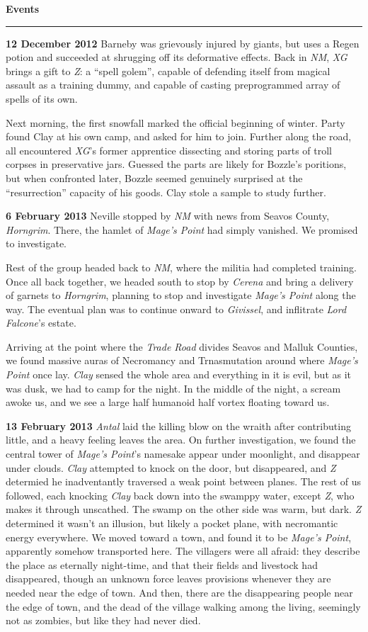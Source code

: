 \documentclass[letterpaper]{article}
\newcommand{\e}[1]{\emph{#1}}
\newcommand{\B}[1]{\textbf{#1}}
\newenvironment{notesection}[1]
{ {\huge \B{#1}}\hrule\vspace{0.5em}\begingroup\fontsize{9pt}{12pt}\selectfont}
{\endgroup}
\begin{document}
\begin{notesection}{Events}
\B{12 December 2012} Barneby was grievously injured by giants, but uses a Regen potion and succeeded at shrugging off its deformative effects. Back in \e{NM}, \e{XG} brings a gift to \e{Z}: a ``spell golem'', capable of defending itself from magical assault as a training dummy, and capable of casting preprogrammed array of spells of its own.

Next morning, the first snowfall marked the official beginning of winter.  Party found Clay at his own camp, and asked for him to join.  Further along the road, all encountered \e{XG}'s former apprentice dissecting and storing parts of troll corpses in preservative jars.  Guessed the parts are likely for Bozzle's poritions, but when confronted later, Bozzle seemed genuinely surprised at the ``resurrection'' capacity of his goods.  Clay stole a sample to study further.

\B{6 February 2013} Neville stopped by \e{NM} with news from Seavos County, \e{Horngrim}.  There, the hamlet of \e{Mage's Point} had simply vanished.  We promised to investigate.

Rest of the group headed back to \e{NM}, where the militia had completed training. Once all back together, we headed south to stop by \e{Cerena} and bring a delivery of garnets to \e{Horngrim}, planning to stop and investigate \e{Mage's Point} along the way.  The eventual plan was to continue onward to \e{Givissel}, and inflitrate \e{Lord Falcone}'s estate.

Arriving at the point where the \e{Trade Road} divides Seavos and Malluk Counties, we found massive auras of Necromancy and Trnasmutation around where \e{Mage's Point} once lay. \e{Clay} sensed the whole area and everything in it is evil, but as it was dusk, we had to camp for the night.  In the middle of the night, a scream awoke us, and we see a large half humanoid half vortex floating toward us.

\B{13 February 2013} \e{Antal} laid the killing blow on the wraith after contributing little, and a heavy feeling leaves the area.  On further investigation, we found the central tower of \e{Mage's Point}'s namesake appear under moonlight, and disappear under clouds.  \e{Clay} attempted to knock on the door, but disappeared, and \e{Z} determied he inadventantly traversed a weak point between planes. The rest of us followed, each knocking \e{Clay} back down into the swamppy water, except \e{Z}, who makes it through unscathed. The swamp on the other side was warm, but dark. \e{Z} determined it wasn't an illusion, but likely a pocket plane, with necromantic energy everywhere. We moved toward a town, and found it to be \e{Mage's Point}, apparently somehow transported here.  The villagers were all afraid: they describe the place as eternally night-time, and that their fields and livestock had disappeared, though an unknown force leaves provisions whenever they are needed near the edge of town.  And then, there are the disappearing people near the edge of town, and the dead of the village walking among the living, seemingly not as zombies, but like they had never died.


\end{notesection}
\end{document}
